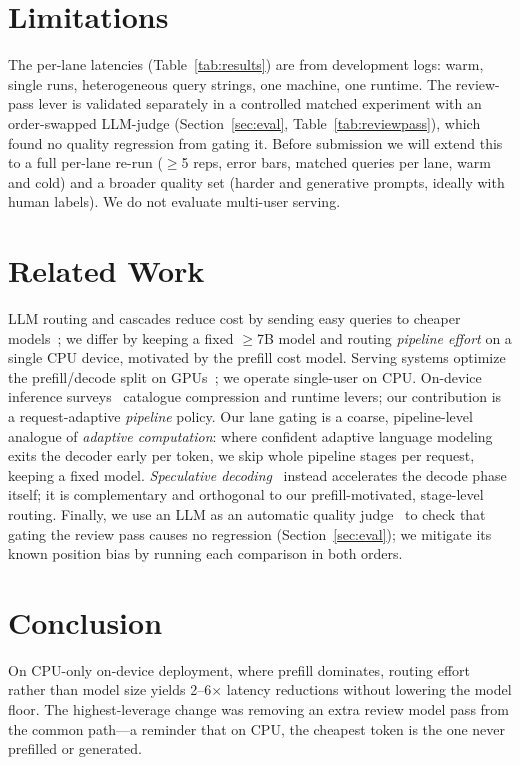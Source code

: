 \documentclass[10pt,twocolumn]{article}
\begin{document}
\section{Limitations}
\label{sec:limitations}
The per-lane latencies (Table~\ref{tab:results}) are from development logs:
warm, single runs, heterogeneous query strings, one machine, one runtime.
The review-pass lever is validated separately in a controlled matched
experiment with an order-swapped LLM-judge (Section~\ref{sec:eval},
Table~\ref{tab:reviewpass}), which found no quality regression from gating
it. Before submission we will extend this to a full per-lane re-run
($\geq$5 reps, error bars, matched queries per lane, warm and cold) and a
broader quality set (harder and generative prompts, ideally with human
labels). We do not evaluate multi-user serving.

\section{Related Work}
\label{sec:related}
LLM routing and cascades reduce cost by sending easy queries to cheaper
models~\cite{chen2023frugalgpt, ong2024routellm}; we differ by keeping a
fixed $\geq$7B model and routing \emph{pipeline effort} on a single CPU
device, motivated by the prefill cost model. Serving systems optimize the
prefill/decode split on GPUs~\cite{kwon2023pagedattention,
agrawal2024sarathi}; we operate single-user on CPU. On-device inference
surveys~\cite{xu2024ondevicereview} catalogue compression and runtime
levers; our contribution is a request-adaptive \emph{pipeline} policy.
Our lane gating is a coarse, pipeline-level analogue of \emph{adaptive
computation}: where confident adaptive language
modeling~\cite{schuster2022calm} exits the decoder early per token, we skip
whole pipeline stages per request, keeping a fixed model. \emph{Speculative
decoding}~\cite{leviathan2023speculative} instead accelerates the decode
phase itself; it is complementary and orthogonal to our prefill-motivated,
stage-level routing. Finally, we use an LLM as an automatic quality
judge~\cite{zheng2023judging} to check that gating the review pass causes no
regression (Section~\ref{sec:eval}); we mitigate its known position bias by
running each comparison in both orders.

\section{Conclusion}
\label{sec:conclusion}
On CPU-only on-device deployment, where prefill dominates, routing effort
rather than model size yields 2--6$\times$ latency reductions without
lowering the model floor. The highest-leverage change was removing an
extra review model pass from the common path---a reminder that on CPU, the
cheapest token is the one never prefilled or generated.
\end{document}
